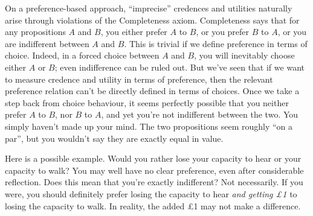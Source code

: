 

On a preference-based approach, ``imprecise'' credences and utilities naturally
arise through violations of the Completeness axiom. Completeness says that for
any propositions $A$ and $B$, you either prefer $A$ to $B$, or you prefer $B$ to
$A$, or you are indifferent between $A$ and $B$. This is trivial if we define
preference in terms of choice. Indeed, in a forced choice between $A$ and $B$,
you will inevitably choose either $A$ or $B$; even indifference can be ruled
out. But we've seen that if we want to measure credence and utility in terms of
preference, then the relevant preference relation can't be directly defined in
terms of choices. Once we take a step back from choice behaviour, it seems
perfectly possible that you neither prefer $A$ to $B$, nor $B$ to $A$, and yet
you're not indifferent between the two. You simply haven't made up your mind.
The two propositions seem roughly ``on a par'', but you wouldn't say they are
exactly equal in value.


Here is a possible example. Would you rather lose your capacity to hear or your
capacity to walk? You may well have no clear preference, even after considerable
reflection. Does this mean that you're exactly indifferent? Not necessarily. If
you were, you should definitely prefer losing the capacity to hear \emph{and
  getting £1} to losing the capacity to walk. In reality, the added £1 may not
make a difference.

